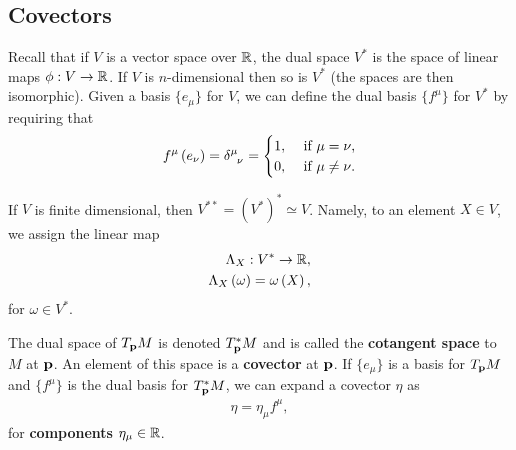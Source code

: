 \subsection{Covectors}

Recall that if $V$ is a vector space over $\mathbb{R}$, the dual space $V^{*}$ is the space of linear maps $\phi : V \to \mathbb{R}$. If $V$ is $n$-dimensional then so is $V^{*}$ (the spaces are then isomorphic). Given a basis $\{e_{\mu}\} $ for $V$, we can define the dual basis $\{f^{\mu}\} $ for $V^{*}$ by requiring that
\begin{align}
    f^{\mu} \left( e_{\nu} \right)  = \tensor{\delta}{^{\mu}_\nu} = \begin{cases}
        1, & \text{~if $\mu = \nu$,}\\
        0, & \text{~if $\mu \neq \nu$.}
    \end{cases}
\end{align}

If $V$ is finite dimensional, then $V^{**}=\left( V^{*} \right)^{*} \simeq  V$. Namely, to an element $X \in V$, we assign the linear map 
\begin{align}
    \Lambda_X : V^{*} \to \mathbb{R}, \\
    \Lambda_X \left( \omega \right) = \omega \left( X \right) 
,\end{align}
for $\omega \in V^{*}$.

\begin{definition}
    The dual space of $T_{\vb{p}}M$ is denoted $T^{*}_{\vb{p}}M$ and is called the \textbf{cotangent space} to $M$ at $\vb{p}$. An element of this space is a \textbf{covector} at $\vb{p}$. If $\{e_{\mu}\} $ is a basis for $T_{\vb{p}}M$ and $\{f^{\mu}\} $ is the dual basis for $T^{*}_{\vb{p}}M$, we can expand a covector $\eta$ as
    \begin{align}
        \eta = \eta_{\mu} f^{\mu}
    ,\end{align}
    for \textbf{components} $\eta_\mu \in \mathbb{R}$.
\end{definition}

